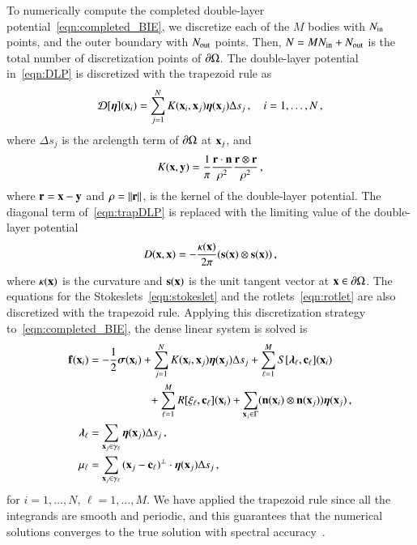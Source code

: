 \documentclass[preprint, 10pt]{elsarticle}
\begin{document}
To numerically compute the completed double-layer
potential~\eqref{eqn:completed_BIE}, we discretize each of the $M$
bodies with  $N_{\mathrm{in}}$ points, and the outer boundary with $N_{\mathrm{out}}$
points.  Then, $N = MN_{\mathrm{in}} + N_{\mathrm{out}}$ is the total number of
discretization points of ${\partial}\Omega$.  The double-layer potential
in~\eqref{eqn:DLP} is discretized with the trapezoid rule as
\begin{align}
  {\mathcal{D}}[{\boldsymbol\eta}]({\mathbf{x}}_i) = \sum_{j=1}^{N} K({\mathbf{x}}_i,{\mathbf{x}}_j) {\boldsymbol\eta}({\mathbf{x}}_j) 
      \Delta s_{j}\, , \quad i=1,\ldots,N \, ,
  \label{eqn:trapDLP}
\end{align}
where $\Delta s_j$ is the arclength term of ${\partial}\Omega$ at
${\mathbf{x}}_j$, and
\begin{align}
  K({\mathbf{x}},{\mathbf{y}}) = \frac{1}{\pi} \frac{{\mathbf{r}} \cdot {\mathbf{n}}}{\rho^2} 
      \frac{{\mathbf{r}} \otimes {\mathbf{r}}}{\rho^2} \, ,
\end{align}
where ${\mathbf{r}} = {\mathbf{x}} - {\mathbf{y}}$ and $\rho = \|{\mathbf{r}}\|$, is the kernel of the
double-layer potential.  The diagonal term of~\eqref{eqn:trapDLP} is
replaced with the limiting value of the double-layer potential
\begin{align}
  D({\mathbf{x}},{\mathbf{x}}) = -\frac{\kappa({\mathbf{x}})}{2\pi}({\mathbf{s}}({\mathbf{x}}) \otimes {\mathbf{s}}({\mathbf{x}})) \, ,
\end{align}
where $\kappa({\mathbf{x}})$ is the curvature and ${\mathbf{s}}({\mathbf{x}})$ is the unit tangent
vector at ${\mathbf{x}} \in {\partial}\Omega$.  The equations for the
Stokeslets~\eqref{eqn:stokeslet} and the rotlets~\eqref{eqn:rotlet} are
also discretized with the trapezoid rule.  Applying this discretization
strategy to~\eqref{eqn:completed_BIE}, the dense linear system is solved is
\begin{equation}
  \label{eqn:completed_BIE_discretized}
  \begin{aligned}
    {\mathbf{f}}({\mathbf{x}}_i) &= -\frac{1}{2}{\boldsymbol\sigma}({\mathbf{x}}_i) + \sum_{j=1}^{N} 
      K({\mathbf{x}}_i,{\mathbf{x}}_j) {\boldsymbol\eta}({\mathbf{x}}_j) \Delta s_{j} + 
      \sum_{\ell=1}^M S[{\boldsymbol\lambda}_\ell,{\mathbf{c}}_\ell]({\mathbf{x}}_i) \\
      &\hspace{53pt}
      +\sum_{\ell=1}^M R[\xi_\ell,{\mathbf{c}}_\ell]({\mathbf{x}}_i) 
      +\sum_{{\mathbf{x}}_j \in \Gamma} ({\mathbf{n}}({\mathbf{x}}_i) \otimes
      {\mathbf{n}}({\mathbf{x}}_j)){\boldsymbol\eta}({\mathbf{x}}_j) \, , \\
    {\boldsymbol\lambda}_\ell &= \sum_{{\mathbf{x}}_j \in \gamma_\ell} {\boldsymbol\eta}({\mathbf{x}}_j) 
      \Delta s_j \, , \\ 
    \mu_\ell &= \sum_{{\mathbf{x}}_j \in \gamma_\ell}
      {({\mathbf{x}}_j - {\mathbf{c}}_\ell)}^\perp \cdot {\boldsymbol\eta}({\mathbf{x}}_j) \Delta s_j \, ,
  \end{aligned}
\end{equation}
for $i=1,\ldots,N$, $\ell=1,\ldots,M$.  We have applied the trapezoid
rule since all the integrands are smooth and periodic, and this
guarantees that the numerical solutions converges to the true solution
with spectral accuracy~\cite{tre-wei2014}.
\end{document}

